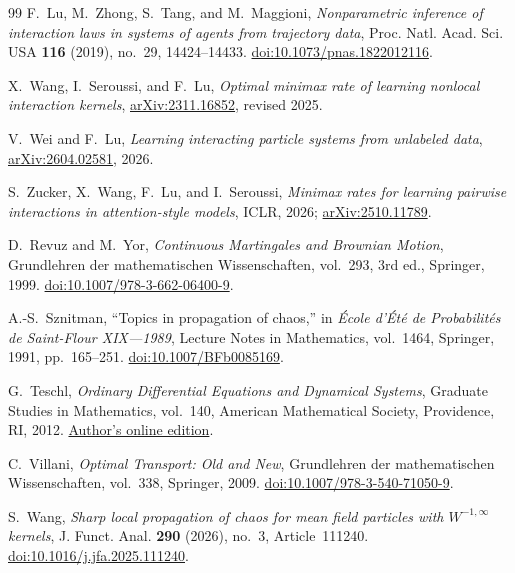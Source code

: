 \documentclass[11pt]{amsart}
\numberwithin{equation}{section}
\theoremstyle{plain}
\begin{document}
\begin{thebibliography}{99}
F.~Lu, M.~Zhong, S.~Tang, and M.~Maggioni,
\emph{Nonparametric inference of interaction laws in systems of agents from
trajectory data},
Proc. Natl. Acad. Sci. USA \textbf{116} (2019), no.~29, 14424--14433.
\href{https://doi.org/10.1073/pnas.1822012116}
{doi:10.1073/pnas.1822012116}.

X.~Wang, I.~Seroussi, and F.~Lu,
\emph{Optimal minimax rate of learning nonlocal interaction kernels},
\href{https://arxiv.org/abs/2311.16852}{arXiv:2311.16852}, revised 2025.

V.~Wei and F.~Lu,
\emph{Learning interacting particle systems from unlabeled data},
\href{https://arxiv.org/abs/2604.02581}{arXiv:2604.02581}, 2026.

S.~Zucker, X.~Wang, F.~Lu, and I.~Seroussi,
\emph{Minimax rates for learning pairwise interactions in attention-style
models},
ICLR, 2026;
\href{https://arxiv.org/abs/2510.11789}{arXiv:2510.11789}.

D.~Revuz and M.~Yor,
\emph{Continuous Martingales and Brownian Motion},
Grundlehren der mathematischen Wissenschaften, vol.~293, 3rd ed.,
Springer, 1999.
\href{https://doi.org/10.1007/978-3-662-06400-9}
{doi:10.1007/978-3-662-06400-9}.

A.-S.~Sznitman,
``Topics in propagation of chaos,'' in
\emph{\'Ecole d'\'Et\'e de Probabilit\'es de Saint-Flour XIX---1989},
Lecture Notes in Mathematics, vol.~1464, Springer, 1991, pp.~165--251.
\href{https://doi.org/10.1007/BFb0085169}{doi:10.1007/BFb0085169}.

G.~Teschl,
\emph{Ordinary Differential Equations and Dynamical Systems},
Graduate Studies in Mathematics, vol.~140,
American Mathematical Society, Providence, RI, 2012.
\href{https://www.mat.univie.ac.at/~gerald/ftp/book-ode/ode.pdf}
{Author's online edition}.

C.~Villani,
\emph{Optimal Transport: Old and New},
Grundlehren der mathematischen Wissenschaften, vol.~338,
Springer, 2009.
\href{https://doi.org/10.1007/978-3-540-71050-9}
{doi:10.1007/978-3-540-71050-9}.

S.~Wang,
\emph{Sharp local propagation of chaos for mean field particles with
$W^{-1,\infty}$ kernels},
J. Funct. Anal. \textbf{290} (2026), no.~3, Article~111240.
\href{https://doi.org/10.1016/j.jfa.2025.111240}
{doi:10.1016/j.jfa.2025.111240}.


\end{thebibliography}
\end{document}
